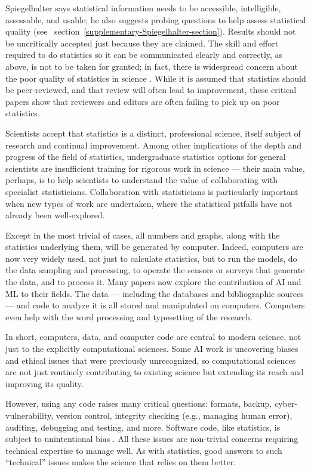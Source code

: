 \documentclass{comjnl}
\begin{document}
Spiegelhalter \cite{Spiegelhalter} says statistical information needs to be accessible, intelligible, assessable, and usable; he also suggests probing questions to help assess statistical quality (see \supplement\ section~\ref{supplementary-Spiegelhalter-section}). Results should not be uncritically accepted just because they are claimed. The skill and effort required to do statistics so it can be communicated clearly and correctly, as above, is not to be taken for granted; in fact, there is widespread concern about the poor quality of statistics in science \cite{paul-hci,pnas-stats}. While it is assumed that statistics should be peer-reviewed, and that review will often lead to improvement, these critical papers show that reviewers and editors are often failing to pick up on poor statistics.

Scientists accept that statistics is a distinct, professional science, itself subject of research and continual improvement. Among other implications of the depth and progress of the field of statistics, undergraduate statistics options for general scientists are insufficient training for rigorous work in science --- their main value, perhaps, is to help scientists to understand the value of collaborating with specialist statisticians. Collaboration with statisticians is particularly important when new types of work are undertaken, where the statistical pitfalls have not already been well-explored.

Except in the most trivial of cases, all numbers and graphs, along with the statistics underlying them, will be generated by computer. Indeed, computers are now very widely used, not just to calculate statistics, but to run the models, do the data sampling and processing, to operate the sensors or surveys that generate the data, and to process it. Many papers now explore the contribution of AI and ML to their fields. The data --- including the databases and bibliographic sources --- and code to analyze it is all stored and manipulated on computers. Computers even help with the word processing and typesetting of the research.

In short, computers, data, and computer code are central to modern science, not just to the explicitly computational sciences. Some AI work is uncovering biases and ethical issues that were previously unrecognized, so computational sciences are not just routinely contributing to existing science but extending its reach and improving its quality.

However, using any code raises many critical questions: formats, backup, cyber-vulnerability, version control, integrity checking (e.g., managing human error), auditing, debugging and testing, and more.  Software code, like statistics, is subject to unintentional bias \cite{Ben,se-bias}.  All these issues are non-trivial concerns requiring technical expertise to manage well. As with statistics, good answers to such ``technical'' issues makes the science that relies on them better.
\end{document}

